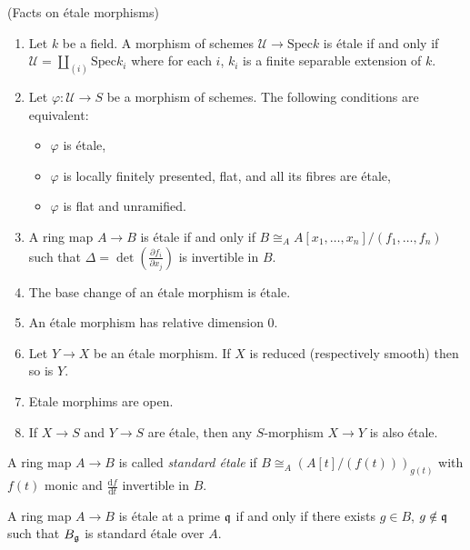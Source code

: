\begin{proposition}
\label{proposition-etale-morphisms}
(Facts on \'etale morphisms)
\begin{enumerate}
\item
Let $k$ be a field. A morphism of schemes $\mathcal{U} \to \text{Spec} k$ is 
\'etale if and only if $\mathcal{U} = \coprod_{(i)} \text{Spec} k_i$ where for 
each $i$, $k_i$ is a finite separable extension of $k$.
\item
Let $\varphi : \mathcal{U} \to S$ be a morphism of schemes. The following 
conditions are equivalent:  
\begin{itemize}
\item $\varphi$ is \'etale,
\item $\varphi$ is locally finitely presented, flat, and all its fibres are 
\'etale,
\item $\varphi$ is flat and unramified.
\end{itemize}
\item
A ring map $A \to B$ is \'etale if and only if $B \cong_A A[x_1, 
\dots,x_n]/(f_1,\dots,f_n)$ such that $\Delta = \det \left( \frac{\partial 
f_i}{\partial x_j} \right) $ is invertible in $B$.
\item
The base change of an \'etale morphism is \'etale.
\item
An \'etale morphism has relative dimension 0.
\item
Let $Y \to X$ be an \'etale morphism. If  $X$ is reduced (respectively smooth) 
then so is $Y$.
\item 
Etale morphims are open.
\item
If $X\to S$ and $Y\to S$ are \'etale, then any $S$-morphism $X \to Y$ is also 
\'etale.
\end{enumerate}
\end{proposition}

\begin{definition}
\label{definition-standard-etale}
A ring map $A \to B$ is called {\it standard \'etale} if $B \cong_A \left( 
A[t]/(f(t)) \right)_{g(t)}$ with $f(t)$ monic and 
$\frac{\mathrm{d}f}{\mathrm{d}t}$ invertible in $B$.
\end{definition}

\begin{theorem}
\label{theorem-standard-etale}
A ring map $A \to B$ is \'etale at a prime $\frak q$ if and only if there 
exists $g \in B$, $g \notin \frak q$ such that $B_{\frak g}$ is standard 
\'etale over $A$.
\end{theorem}






